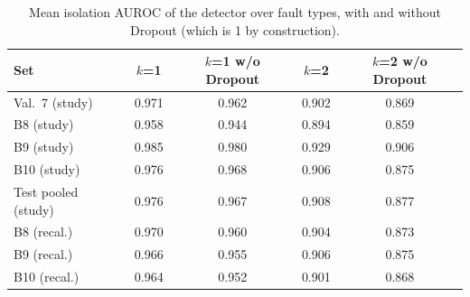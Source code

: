 \begin{table}[t]
\centering
\footnotesize
\caption{Mean isolation AUROC of the detector over fault types, with and without Dropout (which is 1 by construction).}
\label{tab:aurocnodrop}
\setlength{\tabcolsep}{3pt}
\begin{tabular}{lcccc}
\toprule
Set & $k$=1 & $k$=1 w/o Dropout & $k$=2 & $k$=2 w/o Dropout \\
\midrule
Val.\ 7 (study) & 0.971 & 0.962 & 0.902 & 0.869 \\
B8 (study) & 0.958 & 0.944 & 0.894 & 0.859 \\
B9 (study) & 0.985 & 0.980 & 0.929 & 0.906 \\
B10 (study) & 0.976 & 0.968 & 0.906 & 0.875 \\
Test pooled (study) & 0.976 & 0.967 & 0.908 & 0.877 \\
B8 (recal.) & 0.970 & 0.960 & 0.904 & 0.873 \\
B9 (recal.) & 0.966 & 0.955 & 0.906 & 0.875 \\
B10 (recal.) & 0.964 & 0.952 & 0.901 & 0.868 \\
\bottomrule
\end{tabular}
\end{table}
